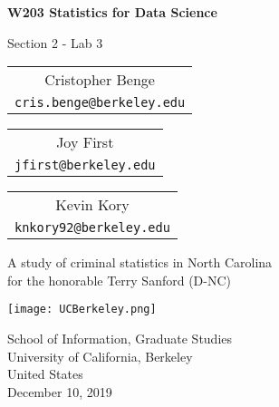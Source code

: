 \begin{titlepage}
	\begin{center}
		\vspace*{1cm}
		
		\Huge
		\textbf{W203 Statistics for Data Science}
		
		\vspace{1.5cm}
		\LARGE
		Section 2 - Lab 3
		
		\normalsize
		\vspace{1.5cm}
		\begin{table}[!ht]
			\centering
			\begin{minipage}[t]{0.3\textwidth}
				\centering
				\begin{tabular}[t]{c}
					{Cristopher Benge} \\
					\texttt{cris.benge@berkeley.edu}\\
				\end{tabular}
			\end{minipage} \hfill
			\begin{minipage}[t]{0.3\textwidth}
				\centering
				\begin{tabular}[t]{c}
					{Joy First} \\
					\texttt{jfirst@berkeley.edu}\\
				\end{tabular}
			\end{minipage} \hfill
			\begin{minipage}[t]{0.3\textwidth}
				\centering
				\begin{tabular}[t]{c}
					{Kevin Kory} \\
					\texttt{knkory92@berkeley.edu}\\
				\end{tabular}
			\end{minipage} \hfill
		\end{table}

		\vfill
		
		\LARGE
		A study of criminal statistics in North Carolina\\
		for the honorable Terry Sanford (D-NC)
		
		\vspace{0.8cm}
		
		\texttt{[image: UCBerkeley.png]}
		
		\vspace{0.5cm}

		\large
		School of Information, Graduate Studies\\
		University of California, Berkeley\\
		United States\\
		December 10, 2019
		
	\end{center}
\end{titlepage}